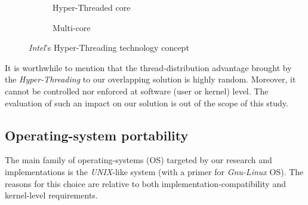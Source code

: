 			\begin{figure}[!h]
				\centering
				\begin{subfigure}[b]{0.48\textwidth}
					\centering
					\caption[Hyper-Threaded core]
					{{\small Hyper-Threaded core}}
				\end{subfigure}
				\hfill
				\begin{subfigure}[b]{0.48\textwidth}  
					\centering
					\caption[]%
					{{\small Multi-core}}
				\end{subfigure}
				\caption{\emph{Intel}'s Hyper-Threading technology concept}
				\label{fig:hyperThreading}
			\end{figure}

		It is worthwhile to mention that the thread-distribution advantage brought by the \emph{Hyper-Threading} to our overlapping solution is highly random.   Moreover, it cannot be controlled nor enforced at software (user or kernel) level.   The evaluation of such an impact on our solution is out of the scope of this study.


	\subsection{Operating-system portability} \label{subsection:osPortability}
		The main family of operating-systems (OS) targeted by our research and implementations is the \emph{UNIX}-like system\cite{wikipediaUNIX} (with a primer for \emph{Gnu-Linux} OS).   The reasons for this choice are relative to both implementation-compatibility and kernel-level requirements.\\

